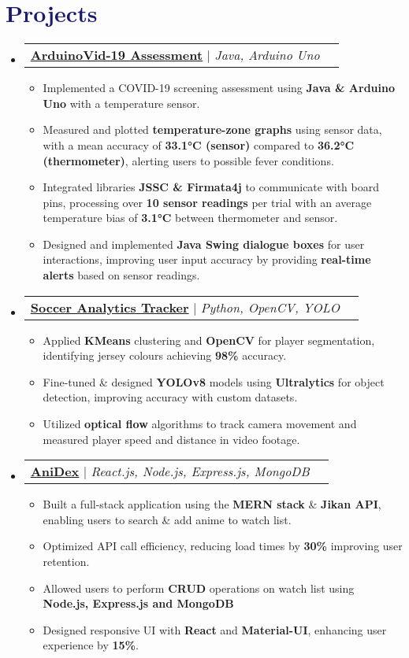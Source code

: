 \documentclass[11pt]{extreport}
\makeatletter
\newcommand{\resumeItem}[1]{
  \item\small{
    {#1 \vspace{-2pt}}
  }
}
\newcommand{\resumeProjectHeading}[2]{
    \item
    \begin{tabular*}{0.97\textwidth}{l@{\extracolsep{\fill}}r}
      \small#1 & #2 \\
    \end{tabular*}\vspace{-7pt}
}
\newcommand{\resumeSubHeadingListStart}{\begin{itemize}[leftmargin=0.15in, label={}]}
\newcommand{\resumeItemListStart}{\begin{itemize}}
\newcommand{\resumeItemListEnd}{\end{itemize}\vspace{-5pt}}
\makeatother
\begin{document}
\section{\textcolor{MidnightBlue}{Projects}}
    \resumeSubHeadingListStart
        \resumeProjectHeading
            {\textbf{\underline{ArduinoVid-19 Assessment}} $|$ \emph{Java, Arduino Uno}}{}
        \resumeItemListStart
            \resumeItem{Implemented a COVID-19 screening assessment using \textbf{Java \& Arduino Uno} with a temperature sensor.}
            \resumeItem{Measured and plotted \textbf{temperature-zone graphs} using sensor data, with a mean accuracy of \textbf{33.1°C (sensor)} compared to \textbf{36.2°C (thermometer)}, alerting users to possible fever conditions.}
            \resumeItem{Integrated libraries \textbf{JSSC \& Firmata4j} to communicate with board pins, processing over \textbf{10 sensor readings} per trial with an average temperature bias of \textbf{3.1°C} between thermometer and sensor.}
            \resumeItem{Designed and implemented \textbf{Java Swing dialogue boxes} for user interactions, improving user input accuracy by providing \textbf{real-time alerts} based on sensor readings.}
        \resumeItemListEnd
           \resumeProjectHeading
            {\textbf{\underline{Soccer Analytics Tracker}} $|$ \emph{Python, OpenCV, YOLO}}{}
        \resumeItemListStart
           \resumeItem{Applied \textbf{KMeans} clustering and \textbf{OpenCV} for player segmentation, identifying jersey colours achieving \textbf{98\%} accuracy.}
            \resumeItem{Fine-tuned \& designed \textbf{YOLOv8} models using \textbf{Ultralytics} for object detection, improving accuracy with custom datasets.}
            \resumeItem{Utilized \textbf{optical flow }algorithms to track camera movement and measured player speed and distance in video footage.}
            \resumeItemListEnd
            \resumeProjectHeading
            {\textbf{\underline{AniDex}} $|$ \emph{React.js, Node.js, Express.js, MongoDB}}{}
        \resumeItemListStart
            \resumeItem{Built a full-stack application using the \textbf{MERN stack} \& \textbf{Jikan API}, enabling users to search \& add anime to watch list.}
            \resumeItem{Optimized API call efficiency, reducing load times by \textbf{30\%} improving user retention.}
            \resumeItem{Allowed users to perform \textbf{CRUD} operations on watch list using \textbf{Node.js, Express.js and MongoDB}}
            \resumeItem{Designed responsive UI with \textbf{React} and \textbf{Material-UI}, enhancing user experience by  \textbf{15\%}.}
        \resumeItemListEnd
        \resumeItemListEnd
        
\end{document}
